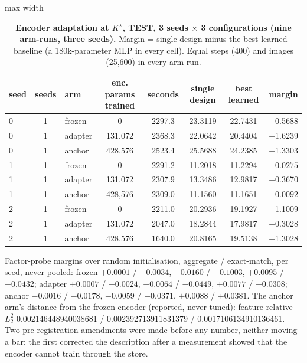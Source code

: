 \documentclass{article} %
\newcommand{\Kstar}{\ensuremath{K^{\star}}}
\begin{document}
\begin{table}[h]
\centering\small
\caption{\textbf{Encoder adaptation at $\Kstar$, TEST, 3 seeds $\times$ 3 configurations (nine
arm-runs, three seeds).} Margin = single design minus the best learned baseline (a 180k-parameter %
MLP in every cell). Equal steps (400) and images (25,600) in every arm-run.} %
\label{tab:adapt}
\setlength{\tabcolsep}{3pt}
\begin{adjustbox}{max width=\linewidth}\begin{tabular}{lclccccc}
\toprule
seed & seeds & arm & enc. params trained & seconds & single design & best learned & margin \\
\midrule
0 & 1 & frozen & 0 & 2297.3 & 23.3119 & 22.7431 & +0.5688 \\
0 & 1 & adapter & 131,072 & 2368.3 & 22.0642 & 20.4404 & +1.6239 \\
0 & 1 & anchor & 428,576 & 2523.4 & 25.5688 & 24.2385 & +1.3303 \\
1 & 1 & frozen & 0 & 2291.2 & 11.2018 & 11.2294 & $-0.0275$ \\
1 & 1 & adapter & 131,072 & 2307.9 & 13.3486 & 12.9817 & +0.3670 \\
1 & 1 & anchor & 428,576 & 2309.0 & 11.1560 & 11.1651 & $-0.0092$ \\
2 & 1 & frozen & 0 & 2211.0 & 20.2936 & 19.1927 & +1.1009 \\
2 & 1 & adapter & 131,072 & 2047.0 & 18.2844 & 17.9817 & +0.3028 \\
2 & 1 & anchor & 428,576 & 1640.0 & 20.8165 & 19.5138 & +1.3028 \\
\bottomrule
\end{tabular}\end{adjustbox}
\end{table}

\noindent Factor-probe margins over random initialisation, aggregate / exact-match, per seed, never
pooled: frozen $+0.0001$ / $-0.0034$, $-0.0160$ / $-0.1003$, $+0.0095$ / $+0.0432$; adapter
$+0.0007$ / $-0.0024$, $-0.0064$ / $-0.0449$, $+0.0077$ / $+0.0308$; anchor $-0.0016$ / $-0.0178$,
$-0.0059$ / $-0.0371$, $+0.0088$ / $+0.0381$. The anchor arm's distance from the frozen encoder
(reported, never tuned): feature relative $L_2^2$ 0.002146448940038681 / 0.002392713911831379 /
0.0017106134910136461. %
Two pre-registration amendments were made before any number, neither moving a bar; the first
corrected the description after a measurement showed that the encoder cannot train through the
store. %
\end{document}

